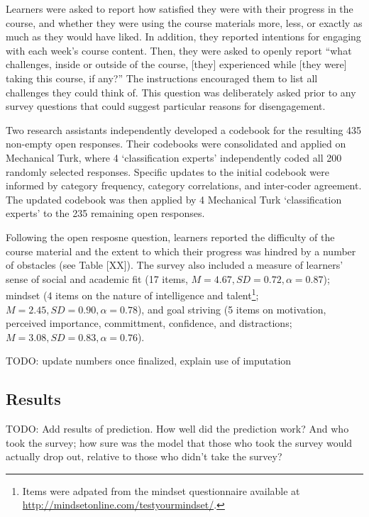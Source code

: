 \documentclass{sigchi}\usepackage[]{graphicx}\usepackage[]{color}
\begin{document}
Learners were asked to report how satisfied they were with their progress in the course, and whether they were using the course materials more, less, or exactly as much as they would have liked. In addition, they reported intentions for engaging with each week's course content. Then, they were asked to openly report ``what challenges, inside or outside of the course, [they] experienced while [they were] taking this course, if any?'' The instructions encouraged them to list all challenges they could think of. This question was deliberately asked prior to any survey questions that could suggest particular reasons for disengagement.

Two research assistants independently developed a codebook for the resulting 435 non-empty open responses. Their codebooks were consolidated and applied on Mechanical Turk, where 4 `classification experts' independently coded all 200 randomly selected responses. Specific updates to the initial codebook were informed by category frequency, category correlations, and inter-coder agreement. The updated codebook was then applied by 4 Mechanical Turk `classification experts' to the 235 remaining open responses.

Following the open resposne question, learners reported the difficulty of the course material and the extent to which their progress was hindred by a number of obstacles (see Table [XX]). The survey also included a measure of learners' sense of social and academic fit \cite{walton2007question} (17 items, $M=4.67, SD=0.72, \alpha=0.87$); mindset (4 items on the nature of intelligence and talent\footnote{Items were adpated from the mindset questionnaire available at \url{http://mindsetonline.com/testyourmindset/}.}; $M=2.45, SD=0.90, \alpha=0.78$), and goal striving (5 items on motivation, perceived importance, committment, confidence, and distractions; $M=3.08, SD=0.83, \alpha=0.76$).

TODO: update numbers once finalized, explain use of imputation

\subsection{Results}





TODO: Add results of prediction. How well did the prediction work? And who took the survey; how sure was the model that those who took the survey would actually drop out, relative to those who didn't take the survey?
\end{document}
